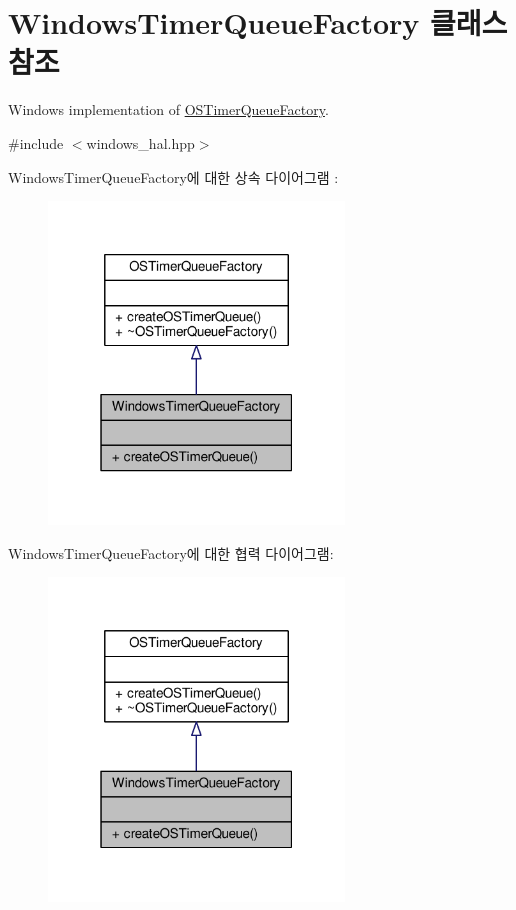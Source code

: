 \hypertarget{class_windows_timer_queue_factory}{}\section{Windows\+Timer\+Queue\+Factory 클래스 참조}
\label{class_windows_timer_queue_factory}


Windows implementation of \hyperlink{class_o_s_timer_queue_factory}{O\+S\+Timer\+Queue\+Factory}.  




{\ttfamily \#include $<$windows\+\_\+hal.\+hpp$>$}



Windows\+Timer\+Queue\+Factory에 대한 상속 다이어그램 \+: 
\nopagebreak
\begin{figure}[H]
\begin{center}
\leavevmode
\includegraphics[width=223pt]{class_windows_timer_queue_factory__inherit__graph}
\end{center}
\end{figure}


Windows\+Timer\+Queue\+Factory에 대한 협력 다이어그램\+:
\nopagebreak
\begin{figure}[H]
\begin{center}
\leavevmode
\includegraphics[width=223pt]{class_windows_timer_queue_factory__coll__graph}
\end{center}
\end{figure}
